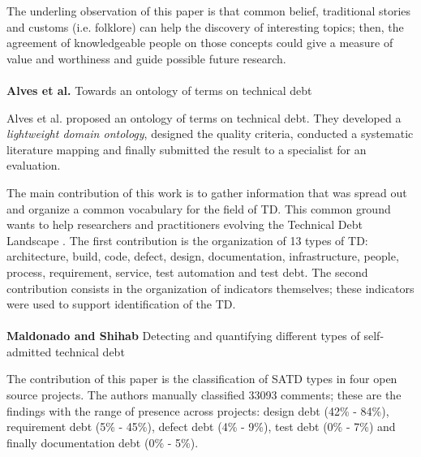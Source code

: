 The underling observation of this paper is that common belief, traditional stories and customs (i.e. folklore) can help the discovery of interesting topics; then, the agreement of knowledgeable people on those concepts could give a measure of value and worthiness and guide possible future research.
\\
\\

\textbf{Alves et al.} \cite{alves2014towards} Towards an ontology of terms on technical debt

Alves et al. proposed an ontology of terms on technical debt. They developed a \emph{lightweight domain ontology}, designed the quality criteria, conducted a systematic literature mapping and finally submitted the result to a specialist for an evaluation.

The main contribution of this work is to gather information that was spread out and organize a common vocabulary for the field of TD. This common ground wants to help researchers and practitioners evolving the Technical Debt Landscape \cite{izurieta2012organizing}.
The first contribution is the organization of 13 types of TD: architecture, build, code, defect, design, documentation, infrastructure, people, process, requirement, service, test automation and test debt.
The second contribution consists in the organization of indicators themselves; these indicators were used to support identification of the TD.
\\
\\
\textbf{Maldonado and Shihab} \cite{maldonado2015detecting} Detecting and quantifying different types of self-admitted technical debt

The contribution of this paper is the classification of SATD types in four open source projects. The authors manually classified 33093 comments; these are the findings with the range of presence across projects: design debt (42\% - 84\%), requirement debt (5\% - 45\%), defect debt (4\% - 9\%), test debt (0\% - 7\%) and finally documentation debt (0\% - 5\%).

